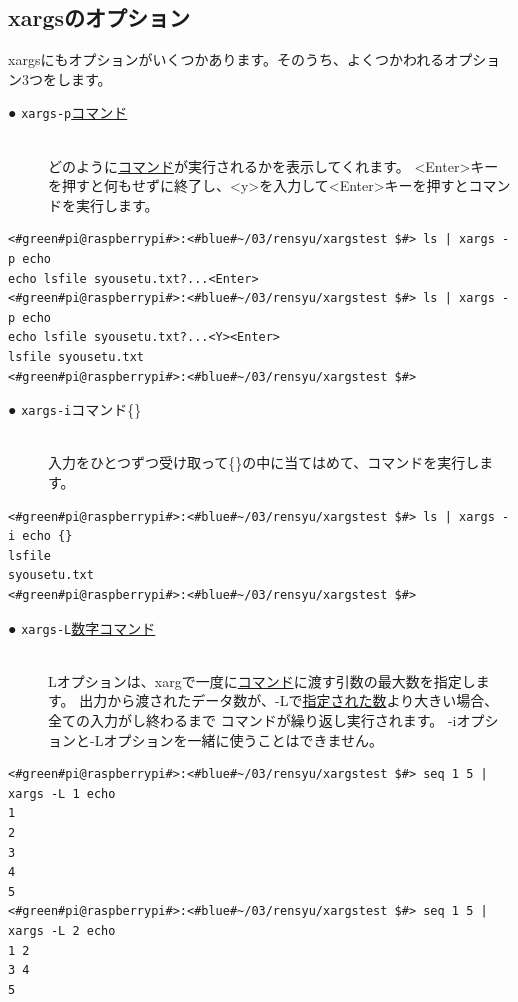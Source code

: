 \documentclass[text03.tex]{subfiles}
\begin{document}
\subsection{xargsのオプション}
xargsにもオプションがいくつかあります。そのうち、よくつかわれるオプション3つをします。

\begin{description}
    \item[● \texttt{xargs}\textvisiblespace \texttt{-p}\textvisiblespace \underline{コマンド}]\mbox{}\\
    どのように\underline{コマンド}が実行されるかを表示してくれます。
    <Enter>キーを押すと何もせずに終了し、<y>を入力して<Enter>キーを押すとコマンドを実行します。
\end{description}

\begin{lstlisting}[caption=xargsコマンドのオプションp]
<#green#pi@raspberrypi#>:<#blue#~/03/rensyu/xargstest $#> ls | xargs -p echo
echo lsfile syousetu.txt?...<Enter>
<#green#pi@raspberrypi#>:<#blue#~/03/rensyu/xargstest $#> ls | xargs -p echo
echo lsfile syousetu.txt?...<Y><Enter>
lsfile syousetu.txt
<#green#pi@raspberrypi#>:<#blue#~/03/rensyu/xargstest $#>
\end{lstlisting}

\begin{description}
    \item[● \texttt{xargs}\textvisiblespace \texttt{-i}\textvisiblespace コマンド\textvisiblespace \{\}]\mbox{}\\
    入力をひとつずつ受け取って\{\}の中に当てはめて、コマンドを実行します。
\end{description}

\begin{lstlisting}[caption=xargsコマンドのオプションi]
<#green#pi@raspberrypi#>:<#blue#~/03/rensyu/xargstest $#> ls | xargs -i echo {}
lsfile
syousetu.txt
<#green#pi@raspberrypi#>:<#blue#~/03/rensyu/xargstest $#>
\end{lstlisting}
\newpage
\begin{description}
    \item[● \texttt{xargs}\textvisiblespace \texttt{-L}\textvisiblespace\underline{数字}\textvisiblespace\underline{コマンド}]\mbox{}\\
    Lオプションは、xargで一度に\underline{コマンド}に渡す引数の最大数を指定します。
    出力から渡されたデータ数が、-Lで\underline{指定された数}より大きい場合、全ての入力がし終わるまで
    コマンドが繰り返し実行されます。
    -iオプションと-Lオプションを一緒に使うことはできません。
\end{description}
\begin{lstlisting}[caption=xargsコマンドのオプションL]
<#green#pi@raspberrypi#>:<#blue#~/03/rensyu/xargstest $#> seq 1 5 | xargs -L 1 echo
1
2
3
4
5
<#green#pi@raspberrypi#>:<#blue#~/03/rensyu/xargstest $#> seq 1 5 | xargs -L 2 echo
1 2
3 4
5
\end{lstlisting}
\end{document}
